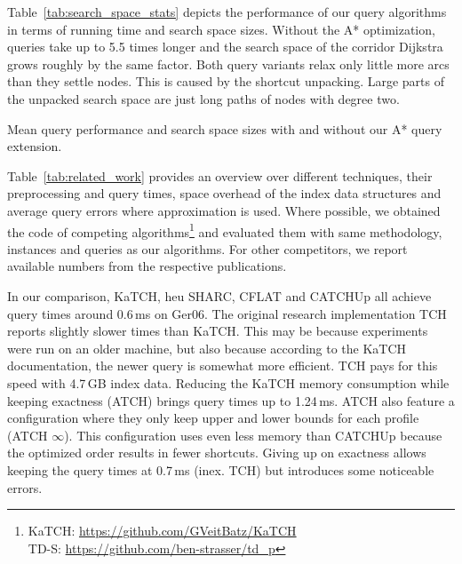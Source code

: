 \documentclass[a4paper,UKenglish,cleveref,autoref]{lipics-v2019}
\newcommand{\tdcch}{CATCHUp}
\begin{document}
Table~\ref{tab:search_space_stats} depicts the performance of our query algorithms in terms of running time and search space sizes. %
Without the A* optimization, queries take up to 5.5 times longer and the search space of the corridor Dijkstra grows roughly by the same factor.
Both query variants relax only little more arcs than they settle nodes.
This is caused by the shortcut unpacking.
Large parts of the unpacked search space are just long paths of nodes with degree two.

\begin{table}[tbh]
\centering
\caption{Mean query performance and search space sizes with and without our A* query extension.}\label{tab:search_space_stats}

\end{table}

Table~\ref{tab:related_work} provides an overview over different techniques, their preprocessing and query times, space overhead of the index data structures and average query errors where approximation is used.
Where possible, we obtained the code of competing algorithms\footnote{KaTCH: \url{https://github.com/GVeitBatz/KaTCH}\\ TD-S: \url{https://github.com/ben-strasser/td_p}} and evaluated them with same methodology, instances and queries as our algorithms.
For other competitors, we report available numbers from the respective publications.

\begin{table}[t!]
\centering
\caption{
Comparison with related work.
We list unscaled numbers as reported in the respective publications for algorithms we could not run ourselves.
Values not reported are indicated as n/r. %
OOM means that the program crashed while trying to allocate more memory than available.
A similar overview with scaled numbers can be found in \protect\cite{d-earpm-16}.
}\label{tab:related_work}

\end{table}

In our comparison, KaTCH, heu SHARC, CFLAT and \tdcch{} all achieve query times around 0.6\,ms on Ger06.
The original research implementation TCH reports slightly slower times than KaTCH.
This may be because experiments were run on an older machine, but also because according to the KaTCH documentation, the newer query is somewhat more efficient.
TCH pays for this speed with 4.7\,GB index data.
Reducing the KaTCH memory consumption while keeping exactness (ATCH) brings query times up to 1.24\,ms.
ATCH also feature a configuration where they only keep upper and lower bounds for each profile (ATCH $\infty$).
This configuration uses even less memory than \tdcch{} because the optimized order results in fewer shortcuts.
Giving up on exactness allows keeping the query times at 0.7\,ms (inex. TCH) but introduces some noticeable errors.
\end{document}
